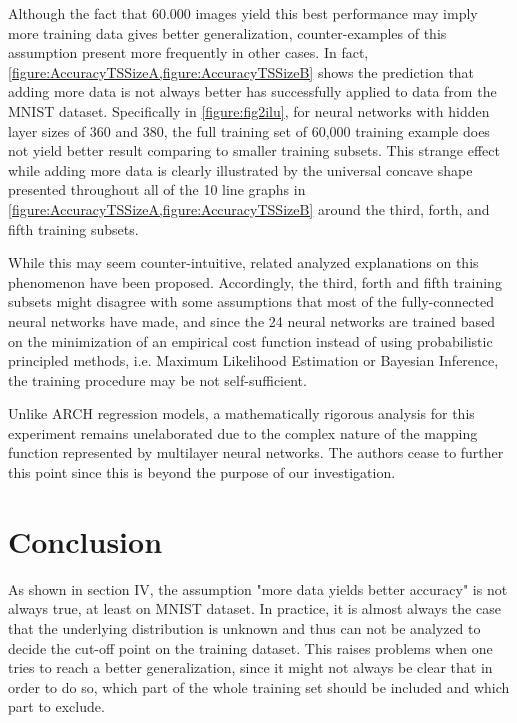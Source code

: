 \documentclass[conference]{IEEEtran}
\begin{document}
Although the fact that 60.000 images yield this best performance may imply more training data gives better generalization, counter-examples of this assumption present more frequently in other cases. In fact, \cref{figure:AccuracyTSSizeA,figure:AccuracyTSSizeB} shows the prediction that adding more data is not always better has successfully applied to data from the MNIST dataset. Specifically in \cref{figure:fig2ilu}, for neural networks with hidden layer sizes of 360 and 380, the full training set of 60,000 training example does not yield better result comparing to smaller training subsets. This strange effect while adding more data is clearly illustrated by the universal concave shape presented throughout all of the 10 line graphs in \cref{figure:AccuracyTSSizeA,figure:AccuracyTSSizeB} around the third, forth, and fifth training subsets. 

While this may seem counter-intuitive, related analyzed explanations on this phenomenon have been proposed\cite{FastKNNClusterBasedTrees, MNISTHandWritten}. Accordingly, the third, forth and fifth training subsets might disagree with some assumptions that most of the fully-connected neural networks have made, and since the 24 neural networks are trained based on the minimization of an empirical cost function instead of using probabilistic principled methods, i.e. Maximum Likelihood Estimation or Bayesian Inference, the training procedure may be not self-sufficient\cite{FastKNNClusterBasedTrees}. 

Unlike ARCH regression models, a mathematically rigorous analysis for this experiment remains unelaborated due to the complex nature of the mapping function represented by multilayer neural networks. The authors cease to further this point since this is beyond the purpose of our investigation.
\FloatBarrier

\section{Conclusion}
\label{sec:conclusion} 
As shown in section IV, the assumption "more data yields better accuracy" is not always true, at least on MNIST dataset. In practice, it is almost always the case that the underlying distribution is unknown and thus can not be analyzed to decide the cut-off point on the training dataset. This raises problems when one tries to reach a better generalization, since it might not always be clear that in order to do so, which part of the whole training set should be included and which part to exclude.
\end{document}
